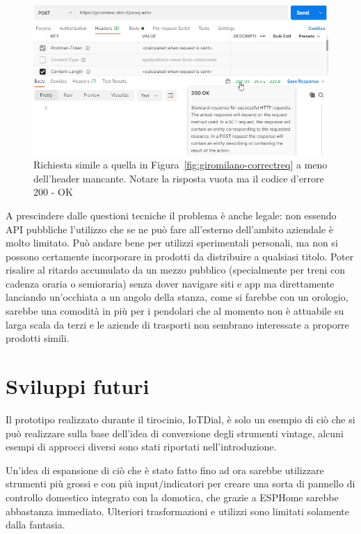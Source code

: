 \documentclass[12pt,a4paper]{report}
\begin{document}
\begin{figure}[h]
  \centering
  \includegraphics[width=\textwidth]{giromilano-missingheader}
  \caption{Richiesta simile a quella in Figura~\ref{fig:giromilano-correctreq} a meno dell'header mancante. Notare la risposta vuota ma il codice d'errore 200 - OK}
  \label{fig:giromilano-missingheader}
\end{figure}


A prescindere dalle questioni tecniche il problema è anche legale: non essendo API pubbliche l'utilizzo che se ne può fare all'esterno
dell'ambito aziendale è molto limitato. Può andare bene per utilizzi sperimentali personali, ma non si possono certamente incorporare
in prodotti da distribuire a qualsiasi titolo.
Poter risalire al ritardo accumulato da un mezzo pubblico (specialmente per treni con cadenza oraria o semioraria) senza dover navigare
siti e app ma direttamente lanciando un'occhiata a un angolo della stanza, come si farebbe con un orologio, sarebbe una comodità in più
per i pendolari che al momento non è attuabile su larga scala da terzi e le aziende di trasporti non sembrano interessate a proporre
prodotti simili.

\section{Sviluppi futuri}
Il prototipo realizzato durante il tirocinio, IoTDial, è solo un esempio di ciò che si può realizzare sulla base dell'idea di conversione degli
strumenti vintage, alcuni esempi di approcci diversi sono stati riportati nell'introduzione.

Un'idea di espansione di ciò che è stato fatto fino ad ora sarebbe utilizzare strumenti più grossi e con più input/indicatori per creare
una sorta di pannello di controllo domestico integrato con la domotica, che grazie a ESPHome sarebbe abbastanza immediato.
Ulteriori trasformazioni e utilizzi sono limitati solamente dalla fantasia.




\end{document}
